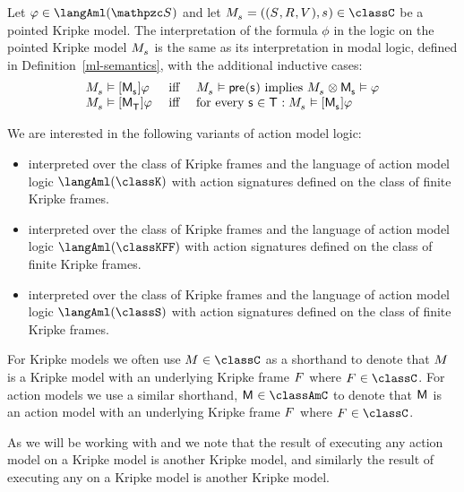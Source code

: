 \begin{definition}
Let $\phi \in \langAml(\aSignatureFamily)$ and let $\kPModelAndTuple{\kStateS} \in \classC$ be a pointed Kripke model.
The interpretation of the formula $\phi$ in the logic \logicAmlC{} on the pointed Kripke model $\kPModel{\kStateS}$ is the same as its interpretation in modal logic, defined in Definition~\ref{ml-semantics}, with the additional inductive cases:
$$
\begin{array}{lcl}
    \kPModel{\kStateS} \entails \actionA{\aPModel{\aStateS}} \phi & \text { iff } & \kPModel{\kStateS} \entails \aPrecondition(\aStateS) \text{ implies } \kPModel{\kStateS} \exec \aPModel{\aStateS} \entails \phi\\
    \kPModel{\kStateS} \entails \actionA{\aPModel{\aStatesT}} \phi & \text { iff } & \text{for every } \aStateS \in \aStatesT: \kPModel{\kStateS} \entails \actionA{\aPModel{\aStateS}} \phi
\end{array}
$$
\end{definition}

We are interested in the following variants of action model logic:
\begin{itemize}
    \item \logicAmlK{} interpreted over the class of \classK{} Kripke frames and the language of action model logic $\langAml(\classK)$ with action signatures defined on the class of finite \classK{} Kripke frames.
    \item \logicAmlKFF{} interpreted over the class of \classKFF{} Kripke frames and the language of action model logic $\langAml(\classKFF)$ with action signatures defined on the class of finite \classKFF{} Kripke frames.
    \item \logicAmlS{} interpreted over the class of \classS{} Kripke frames and the language of action model logic $\langAml(\classS)$ with action signatures defined on the class of finite \classS{} Kripke frames.
\end{itemize}

For Kripke models we often use $\kModel \in \classC$ as a shorthand to denote that $\kModel$ is a Kripke model with an underlying Kripke frame $\kFrame$ where $\kFrame \in \classC$.
For action models we use a similar shorthand, $\aModel \in \classAmC$ to denote that $\aModel$ is an action model with an underlying Kripke frame $\kFrame$ where $\kFrame \in \classC$.

As we will be working with \logicAmlKFF{} and \logicAmlS{} we note that the result of executing any \classAmKFF{} action model on a \classKFF{} Kripke model is another \classKFF{} Kripke model, and similarly the result of executing any \classAmS{} on a \classS{} Kripke model is another \classS{} Kripke model.

